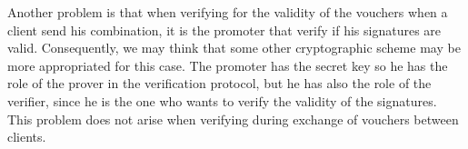 \documentclass[12pt,a4paper]{article}
\begin{document}
    Another problem is that when verifying for the validity of the vouchers when a client send his combination, it is the promoter that verify if
    his signatures are valid. Consequently, we may think that some other cryptographic scheme may be more appropriated for this case. The promoter has the secret key so he has 
    the role of the prover in the verification protocol, but he has also the role of the verifier, since he is the one who wants to verify the validity of the signatures. This problem
    does not arise when verifying during exchange of vouchers between clients.
\end{document}
